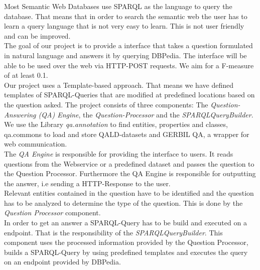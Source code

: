 \documentclass[runningheads]{llncs}
\begin{document}
Most Semantic Web Databases use SPARQL as the language to query the database. That means that in order to search the semantic web the user has to learn a query language that is not very easy to learn. This is not user friendly and can be improved. \\

The goal of our project is to provide a interface that takes a question formulated in natural language and answers it by querying DBPedia. The interface will be able to be used over the web via HTTP-POST requests. We aim for a F-measure of at least 0.1. \\

Our project uses a Template-based approach. That means we have defined templates of SPARQL-Queries that are modified at predefined locations based on the question asked. The project consists of three components: The \emph{Question-Answering (QA) Engine}, the \emph{Question-Processor} and the \emph{SPARQLQueryBuilder}. We use the Library \emph{qa.annotation} to find entities, properties and classes, qa.commons to load and store QALD-datasets and GERBIL QA, a wrapper for web communication. \\

The \emph{QA Engine} is responsible for providing the interface to users. It reads questions from the Webservice or a predefined dataset and passes the question to the Question Processor. Furthermore the QA Engine is responsible for outputting the answer, i.e sending a HTTP-Response to the user. \\

Relevant entities contained in the question have to be identified and the question has to be analyzed to determine the type of the question. This is done by the \emph{Question Processor} component. \\

In order to get an answer a SPARQL-Query has to be build and executed on a endpoint. That is the responsibility of the \emph{SPARQLQueryBuilder}. This component uses the processed information provided by the Question Processor, builds a SPARQL-Query by using predefined templates and executes the query on an endpoint provided by DBPedia. \\ 

\pagebreak
\end{document}
